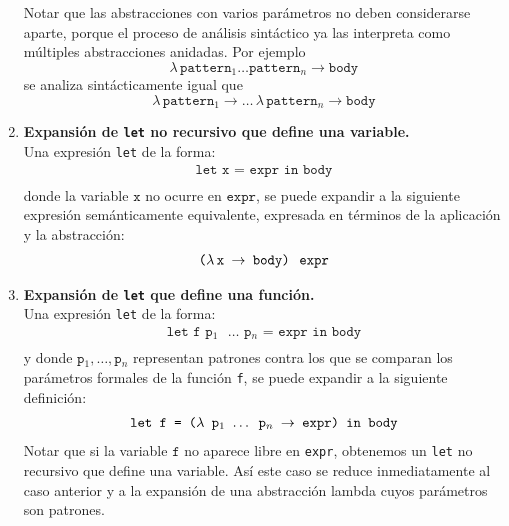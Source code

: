 \begin{enumerate}
    Notar que las abstracciones con varios parámetros no deben considerarse
    aparte, porque el proceso de análisis sintáctico ya las interpreta como
    múltiples abstracciones anidadas.
    Por ejemplo
    \[
      \lambda\,\texttt{pattern$_1$} \hdots \texttt{pattern$_n$} \rightarrow \texttt{body}
    \]
    se analiza sintácticamente igual que
    \[
      \lambda\,\texttt{pattern$_1$} \rightarrow \hdots\,\lambda\,\texttt{pattern$_n$} \rightarrow \texttt{body}
    \]

  \item {\bf Expansión de \texttt{let} no recursivo que define una variable.} \\
     Una expresión \texttt{let} de la forma:
     \[
     \begin{array}{c}
         \texttt{let x = expr in body} \\
     \end{array}
     \]
     donde la variable $\texttt{x}$ no ocurre en $\texttt{expr}$,
     se puede expandir a la siguiente expresión semánticamente equivalente,
     expresada en términos de la aplicación y la abstracción:
     \[
     \begin{array}{c}
         \texttt{($\lambda$\,x $\to$ body)\, expr}
     \end{array}
     \]
  \item {\bf Expansión de \texttt{let} que define una función.} \\
    Una expresión \texttt{let} de la forma:
    \[
    \begin{array}{c}
        \texttt{let f p$_1$ $\dots$ p$_n$ = expr in body}\\
    \end{array}
    \]
    y donde $\texttt{p$_1$}, \hdots, \texttt{p$_n$}$ representan patrones
    contra los que se comparan los parámetros formales de la función \texttt{f},
    se puede expandir a la siguiente definición:
    \[
    \begin{array}{c}
        \texttt{let f = ($\lambda$ \texttt{p$_1$} $\dots$ \texttt{p$_n$} $\to$ expr) in body}\\
    \end{array}
    \]
    Notar que si la variable $\texttt{f}$ no aparece libre en \texttt{expr},
    obtenemos un \texttt{let} no recursivo que define una variable.
    Así este caso se reduce inmediatamente al caso anterior
    y a la expansión de una abstracción lambda cuyos parámetros son patrones.
        

\end{enumerate}
